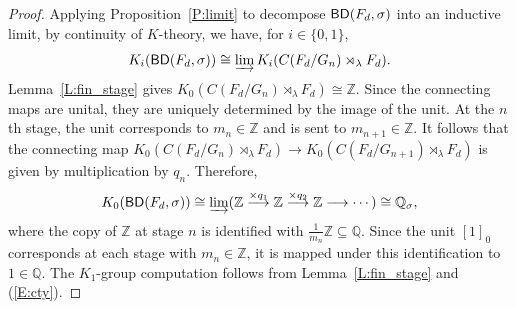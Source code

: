 \documentclass[10pt,a4paper]{amsart}
\newcommand{\BD}{{\sf{BD}}}
\newcommand{\Qb}{\mathbb{Q}}
\newcommand{\Zb}{\mathbb{Z}}
\begin{document}
\begin{proof}
    Applying Proposition~\ref{P:limit} to decompose $\BD(F_d,\sigma)$ into an inductive limit, by continuity of $K$-theory, we have, for $i\in \{0,1\}$, 
    \begin{equation}\label{E:cty}
        K_i(\BD(F_d,\sigma)) \cong \varinjlim K_i(C(F_d/G_n)\rtimes_\lambda F_d).
    \end{equation}
    Lemma~\ref{L:fin_stage} gives $K_0(C(F_d/G_n)\rtimes_\lambda F_d) \cong \Zb$. Since the connecting maps are unital, they are uniquely determined by the image of the unit. At the $n$th stage, the unit corresponds to $m_n \in \Zb$ and is sent to $m_{n+1} \in \Zb$. It follows that the connecting map $K_0(C(F_d/G_{n})\rtimes_\lambda F_d) \to K_0(C(F_d/G_{n+1})\rtimes_\lambda F_d)$ is given by multiplication by $q_n$. Therefore, 
    \[
        K_0(\BD(F_d,\sigma)) \cong \varinjlim (\Zb \stackrel{\times q_1}{\longrightarrow} \Zb \stackrel{\times q_2}{\longrightarrow} \Zb \longrightarrow \cdots) \cong \Qb_\sigma,
    \]
    where the copy of $\Zb$ at stage $n$ is identified with $\frac{1}{m_n}\Zb \subseteq \Qb$. Since the unit $[1]_0$ corresponds at each stage with $m_n \in \Zb$, it is mapped under this identification to $1 \in \Qb$. The $K_1$-group computation follows from Lemma~\ref{L:fin_stage} and (\ref{E:cty}). 
\end{proof}
\end{document}
